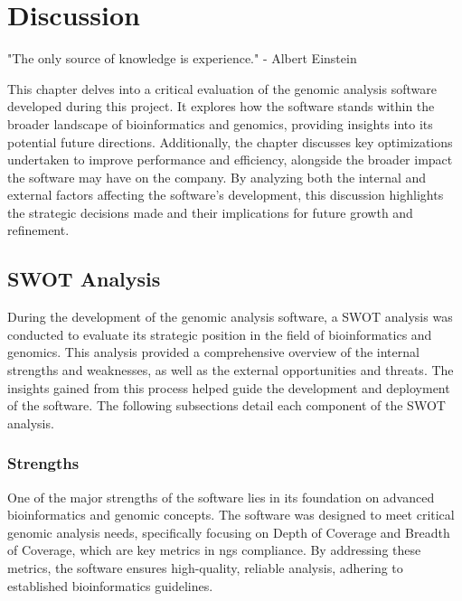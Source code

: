 \chapter{Discussion}
\label{chapter:Discussion}

\begin{introduction}
    "The only source of knowledge is experience." - Albert Einstein
\end{introduction}

This chapter delves into a critical evaluation of the genomic analysis software developed during this project. It explores how the software stands within the broader landscape of bioinformatics and genomics, providing insights into its potential future directions. Additionally, the chapter discusses key optimizations undertaken to improve performance and efficiency, alongside the broader impact the software may have on the company. By analyzing both the internal and external factors affecting the software's development, this discussion highlights the strategic decisions made and their implications for future growth and refinement.

\section{\acs{SWOT} Analysis} \label{sec:intro_swot}

During the development of the genomic analysis software, a \ac{SWOT} analysis was conducted to evaluate its strategic position in the field of bioinformatics and genomics. This analysis provided a comprehensive overview of the internal strengths and weaknesses, as well as the external opportunities and threats. The insights gained from this process helped guide the development and deployment of the software. The following subsections detail each component of the \ac{SWOT} analysis.

\subsection{Strengths}

One of the major strengths of the software lies in its foundation on advanced bioinformatics and genomic concepts. The software was designed to meet critical genomic analysis needs, specifically focusing on Depth of Coverage and Breadth of Coverage, which are key metrics in \ac{ngs} compliance. By addressing these metrics, the software ensures high-quality, reliable analysis, adhering to established bioinformatics guidelines.

